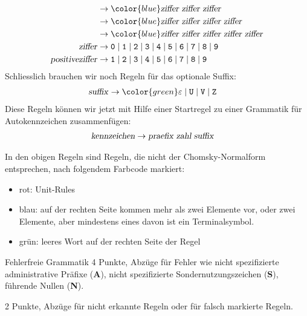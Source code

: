 \begin{loesung}
\begin{teilaufgaben}
\begin{align*}
&\rightarrow
{\color{blue}
\text{\textsl{ziffer}}\;
\text{\textsl{ziffer}}\;
\text{\textsl{ziffer}}}
\\
&\rightarrow
{\color{blue}
\text{\textsl{ziffer}}\;
\text{\textsl{ziffer}}\;
\text{\textsl{ziffer}}\;
\text{\textsl{ziffer}}}
\\
&\rightarrow
{\color{blue}
\text{\textsl{ziffer}}\;
\text{\textsl{ziffer}}\;
\text{\textsl{ziffer}}\;
\text{\textsl{ziffer}}\;
\text{\textsl{ziffer}}}
\\
\text{\textsl{ziffer}}
&\rightarrow
{\tt 0}\;|\;
{\tt 1}\;|\;
{\tt 2}\;|\;
{\tt 3}\;|\;
{\tt 4}\;|\;
{\tt 5}\;|\;
{\tt 6}\;|\;
{\tt 7}\;|\;
{\tt 8}\;|\;
{\tt 9}
\\
\text{\textsl{positiveziffer}}
&\rightarrow
{\tt 1}\;|\;
{\tt 2}\;|\;
{\tt 3}\;|\;
{\tt 4}\;|\;
{\tt 5}\;|\;
{\tt 6}\;|\;
{\tt 7}\;|\;
{\tt 8}\;|\;
{\tt 9}
\\
\end{align*}
Schliesslich brauchen wir noch Regeln für das optionale Suffix:
\begin{align*}
\text{\textsl{suffix}}
&\rightarrow{\color{green}\varepsilon} \;|\;
{\tt U} \;|\;
{\tt V} \;|\;
{\tt Z}
\end{align*}
Diese Regeln können wir jetzt mit Hilfe einer Startregel zu einer
Grammatik für Autokennzeichen zusammenfügen:
\begin{align*}
\text{\textsl{kennzeichen}}&\rightarrow
\text{\textsl{praefix}}\;\text{\textsl{zahl}}\;\text{\textsl{suffix}}
\end{align*}
\item In den obigen Regeln sind Regeln, die nicht der Chomsky-Normalform
entsprechen, nach folgendem Farbcode markiert:
\begin{itemize}
\item {\color{red} rot}: Unit-Rules
\item {\color{blue} blau}: auf der rechten Seite kommen mehr als
zwei Elemente vor, oder zwei Elemente, aber mindestens eines davon
ist ein Terminalsymbol.
\item {\color{green} grün}: leeres Wort auf der rechten Seite der Regel
\qedhere
\end{itemize}
\end{teilaufgaben}
\end{loesung}

\begin{bewertung}
\begin{teilaufgaben}
\item Fehlerfreie Grammatik 4 Punkte, Abzüge für Fehler wie
nicht spezifizierte administrative Präfixe ({\bf A}), nicht spezifizierte
Sondernutzungszeichen ({\bf S}), führende Nullen ({\bf N}).
\item 2 Punkte, Abzüge für nicht erkannte Regeln oder für falsch
markierte Regeln.
\end{teilaufgaben}
\end{bewertung}

